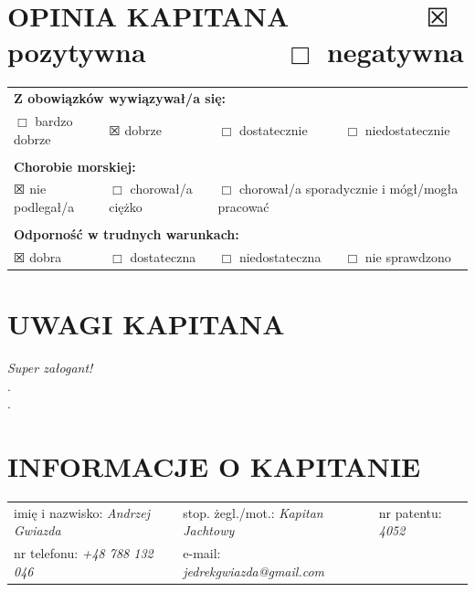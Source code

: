 \documentclass{article}
\begin{document}
\section*{OPINIA KAPITANA ~~~~~~~~ $\XBox$ pozytywna ~~~~~~~~ $\Box$ negatywna}

\begin{tabularx}{\textwidth}{X X X X}
\multicolumn{4}{l}{\textbf{Z obowiązków wywiązywał/a się:}}\\
$\Box$ bardzo dobrze & $\XBox$ dobrze & $\Box$ dostatecznie & $\Box$ niedostatecznie\\
\\
\multicolumn{4}{l}{\textbf{Chorobie morskiej:}}\\
$\XBox$ nie podlegał/a & $\Box$ chorował/a ciężko & \multicolumn{2}{l}{$\Box$ chorował/a sporadycznie i mógł/mogła pracować}\\
\\
\multicolumn{4}{l}{\textbf{Odporność w trudnych warunkach:}}\\
$\XBox$ dobra & $\Box$ dostateczna & $\Box$ niedostateczna & $\Box$ nie sprawdzono\\
\end{tabularx}

\section*{UWAGI KAPITANA}


\textit{Super załogant!}\dotfill \\
.\dotfill \\
.\dotfill \\
\section*{INFORMACJE O KAPITANIE}
\begin{tabularx}{\textwidth}{X X X}
imię i nazwisko: \textit{Andrzej Gwiazda} & stop. żegl./mot.: \textit{Kapitan Jachtowy} & nr patentu: \textit{4052} \\
nr telefonu: \textit{+48 788 132 046} & e-mail: \textit{jedrekgwiazda@gmail.com} \\
\end{tabularx}
\end{document}
